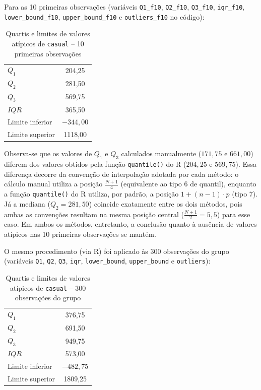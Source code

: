 \documentclass[10pt, a4paper]{article}
\begin{document}
Para as 10 primeiras observações (variáveis \texttt{Q1\_f10}, \texttt{Q2\_f10}, \texttt{Q3\_f10}, \texttt{iqr\_f10}, \texttt{lower\_bound\_f10}, \texttt{upper\_bound\_f10} e \texttt{outliers\_f10} no código):

\begin{table}[h]
\centering
\caption{Quartis e limites de valores atípicos de \texttt{casual} -- 10 primeiras observações}
\label{tab:quartis-10}
\begin{tabular}{lc}
\hline
$Q_1$ & 204,25 \\
$Q_2$ & 281,50 \\
$Q_3$ & 569,75 \\
$IQR$ & 365,50 \\
Limite inferior & $-344{,}00$ \\
Limite superior & 1118,00 \\
\hline
\end{tabular}
\end{table}

Observa-se que os valores de $Q_1$ e $Q_3$ calculados manualmente ($171{,}75$ e $661{,}00$) diferem dos valores obtidos pela função \texttt{quantile()} do R ($204{,}25$ e $569{,}75$). Essa diferença decorre da convenção de interpolação adotada por cada método: o cálculo manual utiliza a posição $\frac{N+1}{4}$ (equivalente ao tipo 6 de quantil), enquanto a função \texttt{quantile()} do R utiliza, por padrão, a posição $1+(n-1)\cdot p$ (tipo 7). Já a mediana ($Q_2 = 281{,}50$) coincide exatamente entre os dois métodos, pois ambas as convenções resultam na mesma posição central ($\frac{N+1}{2} = 5{,}5$) para esse caso. Em ambos os métodos, entretanto, a conclusão quanto à ausência de valores atípicos nas 10 primeiras observações se mantém.

O mesmo procedimento (via R) foi aplicado às 300 observações do grupo (variáveis \texttt{Q1}, \texttt{Q2}, \texttt{Q3}, \texttt{iqr}, \texttt{lower\_bound}, \texttt{upper\_bound} e \texttt{outliers}):

\begin{table}[h]
\centering
\caption{Quartis e limites de valores atípicos de \texttt{casual} -- 300 observações do grupo}
\label{tab:quartis-300}
\begin{tabular}{lc}
\hline
$Q_1$ & 376,75 \\
$Q_2$ & 691,50 \\
$Q_3$ & 949,75 \\
$IQR$ & 573,00 \\
Limite inferior & $-482{,}75$ \\
Limite superior & 1809,25 \\
\hline
\end{tabular}
\end{table}
\end{document}
